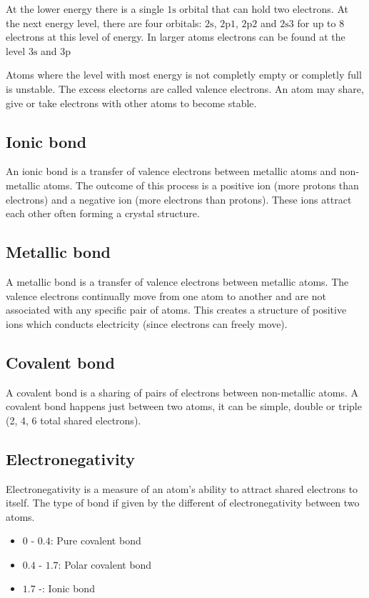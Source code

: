 \documentclass[a4paper]{article}
\begin{document}
At the lower energy there is a single \(1\text{s}\) orbital that can hold two electrons.
At the next energy level, there are four orbitals:
\(2\text{s}\), \(2\text{p}1\), \(2\text{p}2\) and \(2\text{s}3\) for up to 8 electrons at this level of energy.
In larger atoms electrons can be found at the level \(3\text{s}\) and \(3\text{p}\)

Atoms where the level with most energy is not completly empty or completly full is unstable.
The excess electorns are called valence electrons. An atom may share, give or take electrons
with other atoms to become stable.

\subsection{Ionic bond}

An ionic bond is a transfer of valence electrons between metallic atoms and non-metallic atoms.
The outcome of this process is a positive ion (more protons than electrons)
and a negative ion (more electrons than protons). These ions attract each other often
forming a crystal structure.

\subsection{Metallic bond}

A metallic bond is a transfer of valence electrons between metallic atoms.
The valence electrons continually move from one atom to another and are not
associated with any specific pair of atoms. This creates a structure of positive ions
which conducts electricity (since electrons can freely move).

\subsection{Covalent bond}

A covalent bond is a sharing of pairs of electrons between non-metallic atoms.
A covalent bond happens just between two atoms, it can be simple, double or triple (2, 4, 6 total shared electrons).

\subsection{Electronegativity}

Electronegativity is a measure of an atom's ability to attract shared electrons to itself.
The type of bond if given by the different of electronegativity between two atoms.
\begin{itemize}
    \item \(0\) - \(0.4\): Pure covalent bond
    \item \(0.4\) - \(1.7\): Polar covalent bond
    \item \(1.7\) -: Ionic bond
\end{itemize}
\end{document}
